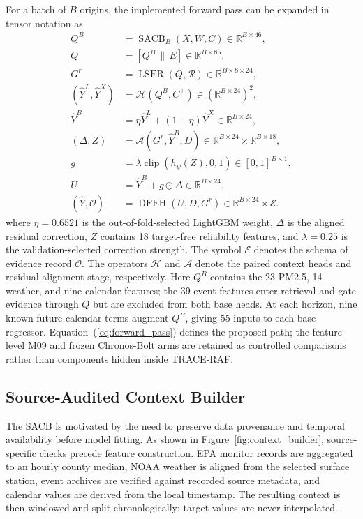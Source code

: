 \documentclass{ieeeaccess}
\begin{document}
For a batch of $B$ origins, the implemented forward pass can be expanded in
tensor notation as
\begin{equation}
\begin{aligned}
Q^B &= \operatorname{SACB}_{B}(X,W,C)\in\mathbb{R}^{B\times46},\\
Q &= [Q^B\,\|\,E]\in\mathbb{R}^{B\times85},\\
G^{r} &= \operatorname{LSER}(Q,\mathcal{R})
\in\mathbb{R}^{B\times8\times24},\\
(\hat{Y}^{L},\hat{Y}^{X}) &= \mathcal{H}(Q^B,C^{+})
\in(\mathbb{R}^{B\times24})^2,\\
\hat{Y}^{B} &= \eta\hat{Y}^{L}+(1-\eta)\hat{Y}^{X}
\in\mathbb{R}^{B\times24},\\
(\Delta,Z) &= \mathcal{A}(G^{r},\hat{Y}^{B},D)
\in\mathbb{R}^{B\times24}\!\times\!\mathbb{R}^{B\times18},\\
g &= \lambda\operatorname{clip}(h_{\psi}(Z),0,1)
\in[0,1]^{B\times1},\\
U &= \hat{Y}^{B}+g\odot\Delta\in\mathbb{R}^{B\times24},\\
(\hat{Y},\mathcal{O}) &= \operatorname{DFEH}(U,D,G^{r})
\in\mathbb{R}^{B\times24}\times\mathcal{E}.
\end{aligned}
\label{eq:forward_pass}
\end{equation}
where $\eta=0.6521$ is the out-of-fold-selected LightGBM weight,
$\Delta$ is the aligned residual correction, $Z$ contains 18 target-free
reliability features, and $\lambda=0.25$ is the validation-selected correction
strength. The symbol $\mathcal{E}$ denotes the schema of evidence record
$\mathcal{O}$. The operators $\mathcal{H}$ and $\mathcal{A}$ denote the paired
context heads and residual-alignment stage, respectively. Here $Q^B$ contains
the 23 PM2.5, 14 weather, and nine calendar
features; the 39 event features enter retrieval and gate evidence through $Q$
but are excluded from both base heads. At each horizon, nine known
future-calendar terms augment $Q^B$, giving 55 inputs to each base regressor.
Equation~(\ref{eq:forward_pass}) defines the proposed path; the
feature-level M09 and frozen Chronos-Bolt arms are retained as controlled
comparisons rather than components hidden inside TRACE-RAF.

\subsection{Source-Audited Context Builder}

The SACB is motivated by the need to preserve data provenance and temporal
availability before model fitting. As shown in Figure~\ref{fig:context_builder},
source-specific checks precede feature construction. EPA monitor records are
aggregated to an hourly county median, NOAA weather is aligned from the selected
surface station, event archives are verified against recorded source metadata,
and calendar values are derived from the local timestamp. The resulting context is
then windowed and split chronologically; target values are never interpolated.
\end{document}
